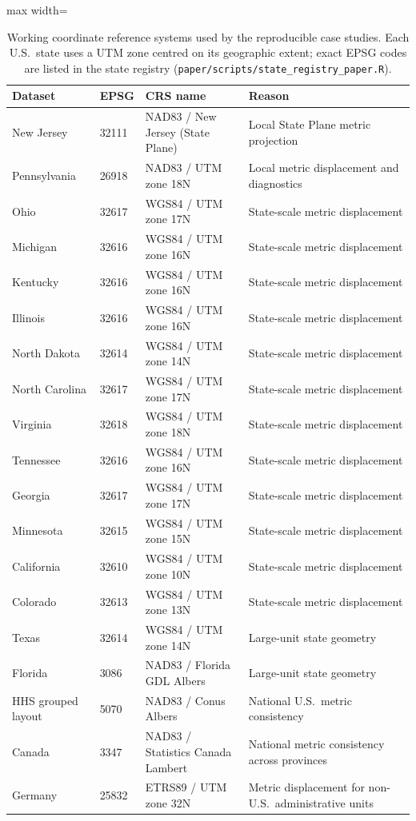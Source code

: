 \documentclass[12pt, a4paper]{article}
\numberwithin{equation}{section}
\begin{document}
\begin{table}[H]
\centering
\caption{Working coordinate reference systems used by the reproducible case studies.
Each U.S.\ state uses a UTM zone centred on its geographic extent; exact EPSG codes
are listed in the state registry (\texttt{paper/scripts/state\_registry\_paper.R}).}
\label{tab:crs}
\begin{adjustbox}{max width=\textwidth}
\begin{tabular}{llll}
\toprule
\textbf{Dataset} & \textbf{EPSG} & \textbf{CRS name} & \textbf{Reason} \\
\midrule
New Jersey       & 32111 & NAD83 / New Jersey (State Plane) & Local State Plane metric projection \\
Pennsylvania     & 26918 & NAD83 / UTM zone 18N & Local metric displacement and diagnostics \\
Ohio             & 32617 & WGS84 / UTM zone 17N & State-scale metric displacement \\
Michigan         & 32616 & WGS84 / UTM zone 16N & State-scale metric displacement \\
Kentucky         & 32616 & WGS84 / UTM zone 16N & State-scale metric displacement \\
Illinois         & 32616 & WGS84 / UTM zone 16N & State-scale metric displacement \\
North Dakota     & 32614 & WGS84 / UTM zone 14N & State-scale metric displacement \\
North Carolina   & 32617 & WGS84 / UTM zone 17N & State-scale metric displacement \\
Virginia         & 32618 & WGS84 / UTM zone 18N & State-scale metric displacement \\
Tennessee        & 32616 & WGS84 / UTM zone 16N & State-scale metric displacement \\
Georgia          & 32617 & WGS84 / UTM zone 17N & State-scale metric displacement \\
Minnesota        & 32615 & WGS84 / UTM zone 15N & State-scale metric displacement \\
California       & 32610 & WGS84 / UTM zone 10N & State-scale metric displacement \\
Colorado         & 32613 & WGS84 / UTM zone 13N & State-scale metric displacement \\
Texas            & 32614 & WGS84 / UTM zone 14N & Large-unit state geometry \\
Florida          & 3086  & NAD83 / Florida GDL Albers & Large-unit state geometry \\
HHS grouped layout & 5070 & NAD83 / Conus Albers & National U.S.\ metric consistency \\
Canada           & 3347  & NAD83 / Statistics Canada Lambert & National metric consistency across provinces \\
Germany          & 25832 & ETRS89 / UTM zone 32N & Metric displacement for non-U.S.\ administrative units \\
\bottomrule
\end{tabular}
\end{adjustbox}
\end{table}
\end{document}
